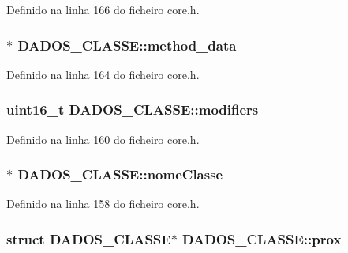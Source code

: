 Definido na linha 166 do ficheiro core.\-h.

\hypertarget{struct_d_a_d_o_s___c_l_a_s_s_e_a75c522131e8a7325da50f22f8c373ffa}{
\subsubsection[{method\-\_\-data}]{$\ast$ D\-A\-D\-O\-S\-\_\-\-C\-L\-A\-S\-S\-E\-::method\-\_\-data}}\label{struct_d_a_d_o_s___c_l_a_s_s_e_a75c522131e8a7325da50f22f8c373ffa}


Definido na linha 164 do ficheiro core.\-h.

\hypertarget{struct_d_a_d_o_s___c_l_a_s_s_e_a49b8ef228c1e9116fa30acb28a3b6402}{
\subsubsection[{modifiers}]{\setlength{\rightskip}{0pt plus 5cm}uint16\-\_\-t D\-A\-D\-O\-S\-\_\-\-C\-L\-A\-S\-S\-E\-::modifiers}}\label{struct_d_a_d_o_s___c_l_a_s_s_e_a49b8ef228c1e9116fa30acb28a3b6402}


Definido na linha 160 do ficheiro core.\-h.

\hypertarget{struct_d_a_d_o_s___c_l_a_s_s_e_aa36d42ba9b426675415d1da6c02e4420}{
\subsubsection[{nome\-Classe}]{$\ast$ D\-A\-D\-O\-S\-\_\-\-C\-L\-A\-S\-S\-E\-::nome\-Classe}}\label{struct_d_a_d_o_s___c_l_a_s_s_e_aa36d42ba9b426675415d1da6c02e4420}


Definido na linha 158 do ficheiro core.\-h.

\hypertarget{struct_d_a_d_o_s___c_l_a_s_s_e_a5d3d779158876f9def507bdad79037be}{
\subsubsection[{prox}]{\setlength{\rightskip}{0pt plus 5cm}struct {\bf D\-A\-D\-O\-S\-\_\-\-C\-L\-A\-S\-S\-E}$\ast$ D\-A\-D\-O\-S\-\_\-\-C\-L\-A\-S\-S\-E\-::prox}}\label{struct_d_a_d_o_s___c_l_a_s_s_e_a5d3d779158876f9def507bdad79037be}


